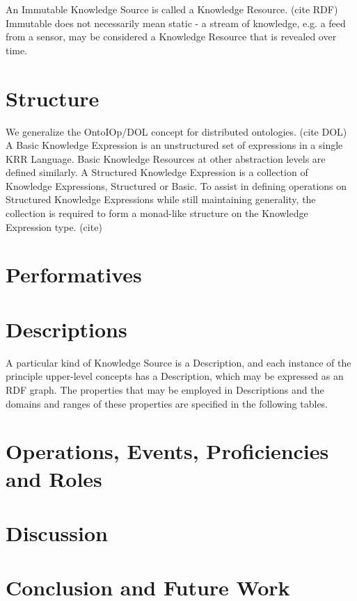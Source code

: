 \documentclass[runningheads]{llncs}
\begin{document}
An Immutable Knowledge Source is called a Knowledge Resource. (cite RDF) Immutable does not necessarily mean static - a stream of knowledge, e.g. a feed from a sensor, may be considered a Knowledge Resource that is revealed over time.

\section{Structure}
We generalize the OntoIOp/DOL concept for distributed ontologies. (cite DOL) A Basic Knowledge Expression is an unstructured set of expressions in a single KRR Language. Basic Knowledge Resources at other abstraction levels are defined similarly. A Structured Knowledge Expression is a collection of Knowledge Expressions, Structured or Basic. To assist in defining operations on Structured Knowledge Expressions while still maintaining generality, the collection is required to form a monad-like structure on the Knowledge Expression type. (cite)

\section{Performatives}

\section{Descriptions}
A particular kind of Knowledge Source is a Description, and each instance of the principle upper-level concepts has a Description, which may be expressed as an RDF graph. The properties that may be employed in Descriptions and the domains and ranges of these properties are specified in the following tables.


\section{Operations, Events, Proficiencies and Roles}


\section{Discussion}

\section{Conclusion and Future Work}
\label{conc}

%
%


\end{document}
